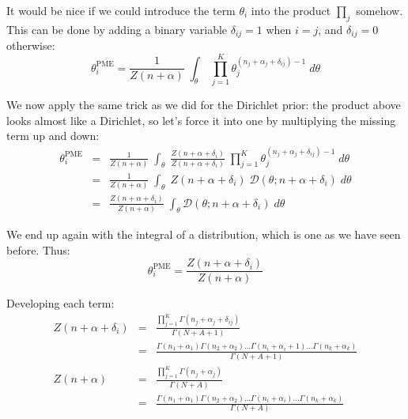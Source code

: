 It would be nice if we could introduce the term $\theta_i$ into the product $\prod_j$ somehow. This can be done by adding a binary variable $\delta_{ij} = 1$ when $i=j$, and $\delta_{ij} = 0$ otherwise:
\begin{equation}
\theta_i^{\text{PME}} =  
\frac{1}{Z(n + \alpha)} \;
\int_{\theta} \;
\prod_{j=1}^K \theta_j ^ {(n_j + \alpha_j + \delta_{ij}) - 1}
\; d \theta 
\end{equation}

We now apply the same trick as we did for the Dirichlet prior: the product above looks almost like a Dirichlet, so let's force it into one by multiplying the missing term up and down:
\begin{eqnarray}
\theta_i^{\text{PME}} & = & 
\frac{1}{Z(n + \alpha)} \;
\int_{\theta} \;
\frac{Z(n + \alpha + \delta_i)}{Z(n + \alpha + \delta_i)}
\;
\prod_{j=1}^K \theta_j ^ {(n_j + \alpha_j + \delta_{ij}) - 1}
\; d \theta 
\\
& = &
\frac{1}{Z(n + \alpha)} \;
\int_{\theta} \;
Z(n + \alpha + \delta_i) \;
\mathcal{D}(\theta; n + \alpha + \delta_i)
\; d \theta
\\
& = &
\frac{Z(n + \alpha + \delta_i)}{Z(n + \alpha)} \;
\int_{\theta}
\mathcal{D}(\theta; n + \alpha + \delta_i)
\; d \theta 
\end{eqnarray}

We end up again with the integral of a distribution, which is one as we have seen before. Thus:
%
\begin{equation}
\theta_i^{\text{PME}} = \frac{Z(n + \alpha + \delta_i)}{Z(n + \alpha)}
\end{equation}

\begin{comment}
\begin{eqnarray}
\theta_i^{\text{PME}} & = & 
\frac{Z(n + \alpha + \delta_i)}{Z(n + \alpha)}
\\
& = &
\frac{\left( \prod_{j=1}^K \Gamma(n_j + \alpha_j + \delta_{ij}) \right) \;
      \Gamma(N + A) }
{\left( \prod_{j=1}^K \Gamma(n_j + \alpha_j) \right) \;
  \Gamma(N + A + 1) }
\end{eqnarray}
\end{comment}

Developing each term:
\begin{eqnarray}
Z(n + \alpha + \delta_i) & = &
\frac{\prod_{j=1}^K \Gamma(n_j + \alpha_j + \delta_{ij})}{\Gamma(N + A + 1)}
\\
& = &
\frac{
\Gamma(n_1 + \alpha_1)
\Gamma(n_2 + \alpha_2) ...
\Gamma(n_i + \alpha_i + 1) ...
\Gamma(n_k + \alpha_k)
}
{\Gamma(N + A + 1)}
\\
Z(n + \alpha) & = &
\frac{\prod_{j=1}^K \Gamma(n_j + \alpha_j)}{\Gamma(N + A)}
\\
& = &
\frac{
\Gamma(n_1 + \alpha_1)
\Gamma(n_2 + \alpha_2) ...
\Gamma(n_i + \alpha_i) ...
\Gamma(n_k + \alpha_k)
}
{\Gamma(N + A)}
\end{eqnarray}

